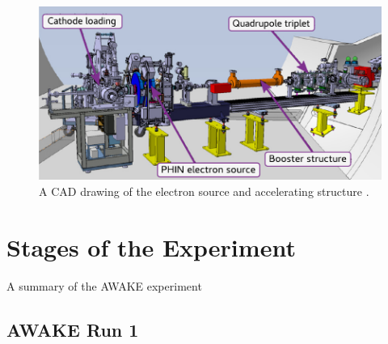\begin{figure}[hbt]
    \centering
    \includegraphics[width=0.70\linewidth,trim={0mm 0mm 0mm 0mm},clip]{figures/ElectronSource}
    \caption{\label{Fig:WFA:ESource} A CAD drawing of the electron source and accelerating structure \cite{pepitone:2016}.}
\end{figure}

\section{Stages of the Experiment}
\label{WFA:AWAKE}

A summary of the AWAKE experiment

\subsection{AWAKE Run 1}
\label{WFA:AWAKE:R1}

